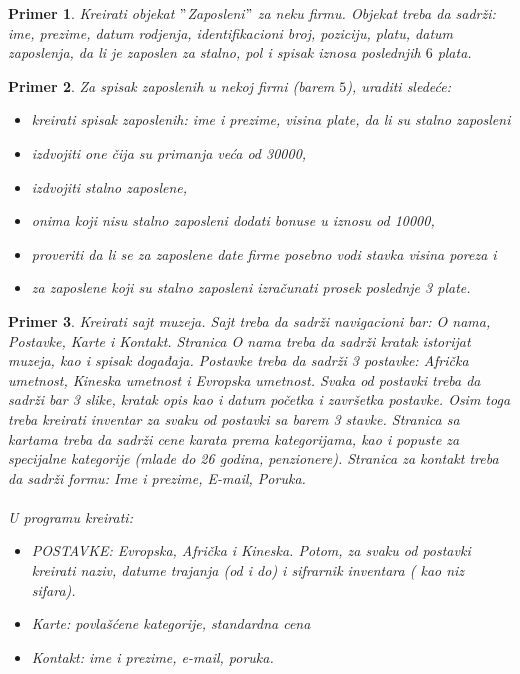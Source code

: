 \documentclass[a4paper]{article}
\newtheorem{primer}{Primer}[section]
\begin{document}
\begin{primer}
Kreirati objekat $"$Zaposleni$"$ za neku firmu. Objekat treba da sadrži: ime, prezime, datum rodjenja, identifikacioni broj, poziciju, platu, datum zaposlenja, da li je zaposlen za stalno, pol i spisak iznosa poslednjih $6$ plata.
\end{primer}

\begin{primer}
Za spisak zaposlenih u nekoj firmi (barem $5$), uraditi sledeće:
\begin{itemize}
	\item kreirati spisak zaposlenih: ime i prezime, visina plate, da li su stalno zaposleni
	\item izdvojiti one čija su primanja veća od 30000,
	\item izdvojiti stalno zaposlene,
	\item onima koji nisu stalno zaposleni dodati bonuse u iznosu od 10000,	
	\item proveriti da li se za zaposlene date firme posebno vodi stavka visina poreza i
	\item za zaposlene koji su stalno zaposleni izračunati prosek poslednje 3 plate.
\end{itemize}

\end{primer}

\begin{primer}
Kreirati sajt muzeja. Sajt treba da sadrži navigacioni bar: O nama, Postavke, Karte i Kontakt. Stranica O nama treba da sadrži kratak istorijat muzeja, kao i spisak događaja. Postavke treba da sadrži 3 postavke: Afrička umetnost, Kineska umetnost i Evropska umetnost. Svaka od postavki treba da sadrži bar 3 slike, kratak opis kao i datum početka i završetka postavke. Osim toga treba kreirati inventar za svaku od postavki sa barem 3 stavke. Stranica sa kartama treba da sadrži cene karata prema kategorijama, kao i popuste za specijalne kategorije (mlade do 26 godina, penzionere). Stranica za kontakt treba da sadrži formu: Ime i prezime, E-mail, Poruka.\\\\
U programu kreirati:
\begin{itemize}
\item POSTAVKE: Evropska, Afrička i Kineska. Potom, za svaku od postavki kreirati naziv, datume trajanja (od i do) i sifrarnik inventara ( kao niz sifara).
\item Karte: povlašćene kategorije, standardna cena
\item Kontakt: ime i prezime, e-mail, poruka.
\end{itemize}  
\end{primer}
\end{document}
